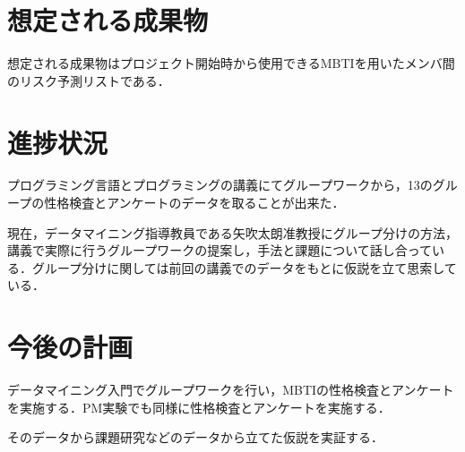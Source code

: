 \documentclass[uplatex,twocolumn,dvipdfmx]{jsarticle}
\begin{document}
\section{想定される成果物}
想定される成果物はプロジェクト開始時から使用できるMBTIを用いたメンバ間のリスク予測リストである．

\section{進捗状況}
プログラミング言語とプログラミングの講義にてグループワークから，13のグループの性格検査とアンケートのデータを取ることが出来た．

現在，データマイニング指導教員である矢吹太朗准教授にグループ分けの方法，講義で実際に行うグループワークの提案し，手法と課題について話し合っている．グループ分けに関しては前回の講義でのデータをもとに仮説を立て思索している．

\section{今後の計画}
データマイニング入門でグループワークを行い，MBTIの性格検査とアンケートを実施する．PM実験でも同様に性格検査とアンケートを実施する．

そのデータから課題研究などのデータから立てた仮説を実証する．


\nocite{110003745117}

\end{document}
